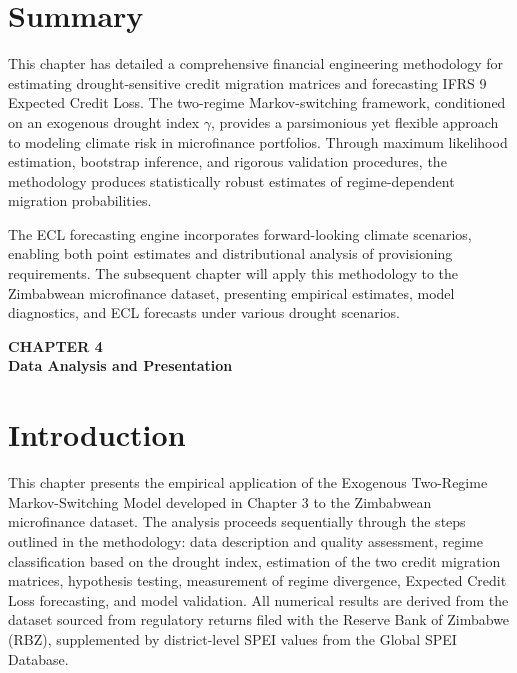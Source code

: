 \documentclass[12pt,a4paper]{article}
\begin{document}
\section{Summary}

This chapter has detailed a comprehensive financial engineering methodology for estimating drought-sensitive credit migration matrices and forecasting IFRS 9 Expected Credit Loss. The two-regime Markov-switching framework, conditioned on an exogenous drought index $\gamma$, provides a parsimonious yet flexible approach to modeling climate risk in microfinance portfolios. Through maximum likelihood estimation, bootstrap inference, and rigorous validation procedures, the methodology produces statistically robust estimates of regime-dependent migration probabilities. 

The ECL forecasting engine incorporates forward-looking climate scenarios, enabling both point estimates and distributional analysis of provisioning requirements. The subsequent chapter will apply this methodology to the Zimbabwean microfinance dataset, presenting empirical estimates, model diagnostics, and ECL forecasts under various drought scenarios.

\newpage

\begin{center}
    {\LARGE\bfseries CHAPTER 4}\\[0.5cm]
    {\Large\bfseries Data Analysis and Presentation}
\end{center}
\setcounter{section}{0}
\renewcommand{\thesection}{4.\arabic{section}}

\vspace{1cm}

\section{Introduction}

This chapter presents the empirical application of the Exogenous Two-Regime Markov-Switching Model developed in Chapter 3 to the Zimbabwean microfinance dataset. The analysis proceeds sequentially through the steps outlined in the methodology: data description and quality assessment, regime classification based on the drought index, estimation of the two credit migration matrices, hypothesis testing, measurement of regime divergence, Expected Credit Loss forecasting, and model validation. All numerical results are derived from the dataset sourced from regulatory returns filed with the Reserve Bank of Zimbabwe (RBZ), supplemented by district-level SPEI values from the Global SPEI Database.
\end{document}
